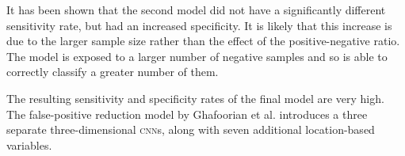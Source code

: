 It has been shown that the second model did not have a significantly different sensitivity rate, but had an increased specificity. It is likely that this increase is due to the larger sample size rather than the effect of the positive-negative ratio. The model is exposed to a larger number of negative samples and so is able to correctly classify a greater number of them.



The resulting sensitivity and specificity rates of the final model are very high. The false-positive reduction model by Ghafoorian et al. \cite{GhafoorianM.2017Dml3} introduces a three separate three-dimensional \textsc{cnn}s, along with seven additional location-based variables. 

